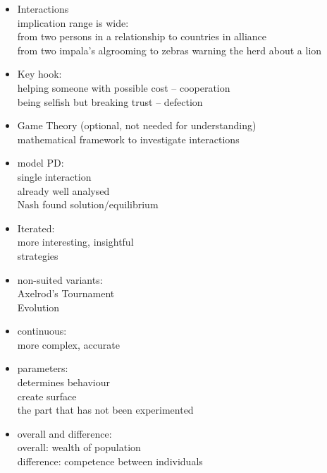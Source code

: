 \documentclass{article}
\begin{document}
\begin{itemize}


	\item Interactions\\
		implication range is wide:\\
		from two persons in a relationship to countries in alliance\\
		from two impala's algrooming to zebras warning the herd about a lion \\

	\item Key hook:\\
		helping someone with possible cost -- cooperation\\
		being selfish but breaking trust -- defection\\

	\item Game Theory (optional, not needed for understanding)\\
		mathematical framework to investigate interactions\\

	\item model PD:\\
		single interaction\\
		already well analysed\\
		Nash found solution/equilibrium\\

	\item Iterated:\\
		more interesting, insightful\\
		strategies\\

	\item non-suited variants:\\
		Axelrod's Tournament\\
		Evolution\\

	\item continuous:\\
		more complex, accurate\\

	\item parameters:\\
		determines behaviour\\
		create surface\\
		the part that has not been experimented\\

	\item overall and difference:\\
		overall: wealth of population\\
		difference: competence between individuals\\

\end{itemize}
\end{document}
